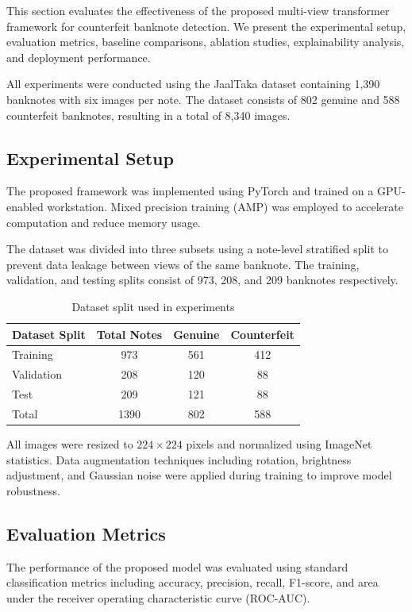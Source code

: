 \documentclass[preprint,12pt,authoryear]{elsarticle}
\begin{document}
This section evaluates the effectiveness of the proposed multi-view transformer framework for counterfeit banknote detection. We present the experimental setup, evaluation metrics, baseline comparisons, ablation studies, explainability analysis, and deployment performance.

All experiments were conducted using the JaalTaka dataset containing 1,390 banknotes with six images per note. The dataset consists of 802 genuine and 588 counterfeit banknotes, resulting in a total of 8,340 images\cite{piyas2025jaaltaka}.

\subsection{Experimental Setup}

The proposed framework was implemented using PyTorch and trained on a GPU-enabled workstation. Mixed precision training (AMP) was employed to accelerate computation and reduce memory usage.

The dataset was divided into three subsets using a note-level stratified split to prevent data leakage between views of the same banknote. The training, validation, and testing splits consist of 973, 208, and 209 banknotes respectively.

\begin{table}[h]
\centering
\caption{Dataset split used in experiments}
\begin{tabular}{lccc}
\hline
Dataset Split & Total Notes & Genuine & Counterfeit \\
\hline
Training & 973 & 561 & 412 \\
Validation & 208 & 120 & 88 \\
Test & 209 & 121 & 88 \\
\hline
Total & 1390 & 802 & 588 \\
\hline
\end{tabular}
\end{table}

All images were resized to $224\times224$ pixels and normalized using ImageNet statistics. Data augmentation techniques including rotation, brightness adjustment, and Gaussian noise were applied during training to improve model robustness.

\subsection{Evaluation Metrics}

The performance of the proposed model was evaluated using standard classification metrics including accuracy, precision, recall, F1-score, and area under the receiver operating characteristic curve (ROC-AUC).
\end{document}
